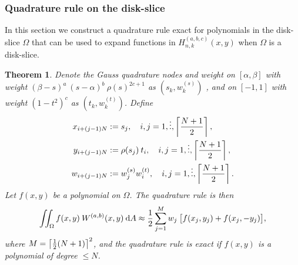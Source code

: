 \documentclass[11pt, oneside]{article}   	%
\newcommand{\half}{\frac{1}{2}}
\newcommand{\hdop}{H}
\newcommand{\Wab}{{W^{(a,b)}}}
\newcommand{\hdopnkabc}{\hdop_{n,k}^{(a,b,c)}}
\newtheorem{theorem}{Theorem}
\begin{document}
\subsubsection{Quadrature rule on the disk-slice}

In this section we construct a quadrature rule exact for polynomials in the disk-slice $\Omega$ that can be used to expand functions in $\hdopnkabc(x,y)$ when $\Omega$ is a disk-slice.

\begin{theorem}
Denote the  Gauss quadrature nodes and weight on $[\alpha,\beta]$ with weight $(\beta - s)^a \: (s - \alpha)^b \: \rho(s)^{2c+1}$ as $(s_k,w_k^{(s)})$ , and
 on \([-1,1]\) with weight \((1-t^2)^c\) as $(t_k,w_k^{(t)})$. Define
\begin{align*}
	x_{i+(j-1)N} &:= s_j, \quad i,j = 1,\vdots, \left\lceil\frac{N+1}{2}\right\rceil, \\
	y_{i+(j-1)N} &:= \rho(s_j) \: t_i, \quad i,j = 1,\vdots, \left\lceil\frac{N+1}{2}\right\rceil, \\
	w_{i+(j-1)N} &:= w_j^{(s)} w_i^{(t)}, \quad  i,j = 1,\vdots, \left\lceil\frac{N+1}{2}\right\rceil.
\end{align*}
Let $f(x,y)$ be a polynomial on $\Omega$. The quadrature rule is then
$$
\iint_\Omega f(x,y) \: \Wab(x,y) \: \D A \approx \half \sum_{j=1}^{M} w_j \: \big[ f(x_j, y_j) + f(x_j, -y_j) \big],
$$
where $M = \ceil{\half(N+1)}^2$, and the quadrature rule is exact if $f(x,y)$ is a polynomial of degree $\le N$.
\end{theorem}
\end{document}

